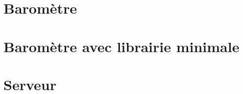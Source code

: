 \documentclass{report}
\begin{document}
	\chapter{Baromètre\label{code:bme}}
		
			
	\chapter{Baromètre avec librairie minimale\label{code:bme2}}
		
		
	\chapter{Serveur}
		
\end{document}
